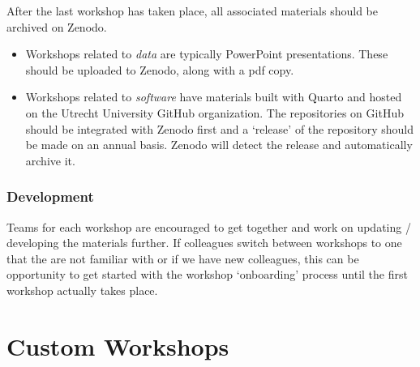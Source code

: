 \documentclass[
  letterpaper,
  DIV=11,
  numbers=noendperiod]{scrreprt}
\begin{document}
After the last workshop has taken place, all associated materials should
be archived on Zenodo.

\begin{itemize}
\item
  Workshops related to \emph{data} are typically PowerPoint
  presentations. These should be uploaded to Zenodo, along with a pdf
  copy.
\item
  Workshops related to \emph{software} have materials built with Quarto
  and hosted on the Utrecht University GitHub organization. The
  repositories on GitHub should be integrated with Zenodo first and a
  `release' of the repository should be made on an annual basis. Zenodo
  will detect the release and automatically archive it.
\end{itemize}

\subsection*{Development}\label{development}

Teams for each workshop are encouraged to get together and work on
updating / developing the materials further. If colleagues switch
between workshops to one that the are not familiar with or if we have
new colleagues, this can be opportunity to get started with the workshop
`onboarding' process until the first workshop actually takes place.


\chapter*{Custom Workshops}\label{custom-workshops}

\end{document}
